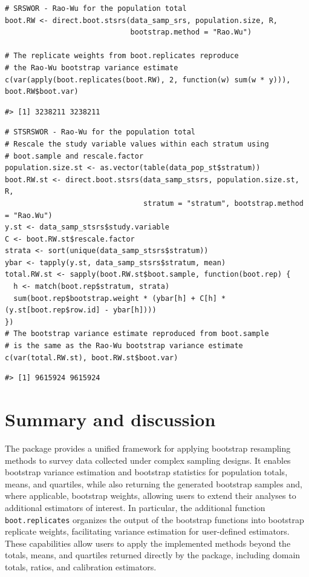 \begin{verbatim}
# SRSWOR - Rao-Wu for the population total
boot.RW <- direct.boot.stsrs(data_samp_srs, population.size, R,
                             bootstrap.method = "Rao.Wu")

# The replicate weights from boot.replicates reproduce 
# the Rao-Wu bootstrap variance estimate
c(var(apply(boot.replicates(boot.RW), 2, function(w) sum(w * y))), boot.RW$boot.var)
\end{verbatim}

\begin{verbatim}
#> [1] 3238211 3238211
\end{verbatim}

\begin{verbatim}
# STSRSWOR - Rao-Wu for the population total
# Rescale the study variable values within each stratum using 
# boot.sample and rescale.factor
population.size.st <- as.vector(table(data_pop_st$stratum))
boot.RW.st <- direct.boot.stsrs(data_samp_stsrs, population.size.st, R,
                                stratum = "stratum", bootstrap.method = "Rao.Wu")
y.st <- data_samp_stsrs$study.variable
C <- boot.RW.st$rescale.factor
strata <- sort(unique(data_samp_stsrs$stratum))
ybar <- tapply(y.st, data_samp_stsrs$stratum, mean)
total.RW.st <- sapply(boot.RW.st$boot.sample, function(boot.rep) {
  h <- match(boot.rep$stratum, strata)
  sum(boot.rep$bootstrap.weight * (ybar[h] + C[h] * (y.st[boot.rep$row.id] - ybar[h])))
})
# The bootstrap variance estimate reproduced from boot.sample
# is the same as the Rao-Wu bootstrap variance estimate
c(var(total.RW.st), boot.RW.st$boot.var)
\end{verbatim}

\begin{verbatim}
#> [1] 9615924 9615924
\end{verbatim}

\section{Summary and discussion}\label{sec:discussion}

The  package provides a unified framework for applying bootstrap resampling methods to survey data collected under complex sampling designs. It enables bootstrap variance estimation and bootstrap statistics for population totals, means, and quartiles, while also returning the generated bootstrap samples and, where applicable, bootstrap weights, allowing users to extend their analyses to additional estimators of interest. In particular, the additional function \texttt{boot.replicates} organizes the output of the bootstrap functions into bootstrap replicate weights, facilitating variance estimation for user-defined estimators. These capabilities allow users to apply the implemented methods beyond the totals, means, and quartiles returned directly by the package, including domain totals, ratios, and calibration estimators.

